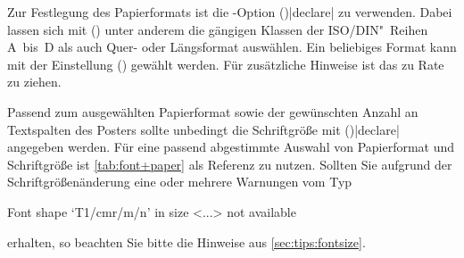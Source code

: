 \begin{Bundle*}{}
Zur Festlegung des Papierformats ist die \KOMAScript-Option 
()|declare| zu verwenden. Dabei lassen 
sich mit () unter anderem 
die gängigen Klassen der ISO/DIN"~Reihen A~bis~D als auch Quer- oder 
Längsformat auswählen. Ein beliebiges Format kann mit der Einstellung
() gewählt werden. Für 
zusätzliche Hinweise ist das \scrguide zu Rate zu ziehen.

Passend zum ausgewählten Papierformat sowie der gewünschten Anzahl an 
Textspalten des Posters sollte unbedingt die Schriftgröße mit 
()|declare| 
angegeben werden. Für eine passend abgestimmte Auswahl von Papierformat und 
Schriftgröße ist \autoref{tab:font+paper} als Referenz zu nutzen. Sollten Sie 
aufgrund der Schriftgrößenänderung eine oder mehrere Warnungen vom Typ
%
\begin{quoting}
\begin{Code}
Font shape `T1/cmr/m/n' in size <...> not available
\end{Code}
\end{quoting}
%
erhalten, so beachten Sie bitte die Hinweise aus \autoref{sec:tips:fontsize}.



\end{Bundle*}
